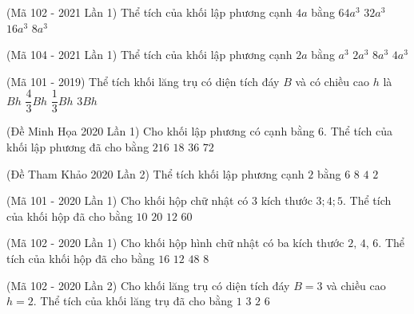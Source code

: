 \begin{ex}%
	(Mã 102 - 2021 Lần 1) Thể tích của khối lập phương cạnh $4a$ bằng
	\choice
	{$64a^3$}
	{$32a^3$}
	{$16a^3$}
	{$8a^3$}
\end{ex}
\begin{ex}%
	(Mã 104 - 2021 Lần 1) Thể tích của khối lập phương cạnh $2a$ bằng
	\choice
	{$a^3$}
	{$2a^3$}
	{$8a^3$}
	{$4a^3$}
\end{ex}
\begin{ex}%
	(Mã 101 - 2019) Thể tích khối lăng trụ có diện tích đáy $B$ và có chiều cao $h$ là
	\choice
	{$Bh$}
	{$\dfrac{4}{3}Bh$}
	{$\dfrac{1}{3}Bh$}
	{$3Bh$}
\end{ex}
\begin{ex}%
	(Đề Minh Họa 2020 Lần 1) Cho khối lập phương có cạnh bằng $6$. Thể tích của khối lập phương đã cho bằng
	\choice
	{\True $216$}
	{$18$}
	{$36$}
	{$72$}
\end{ex}
\begin{ex}%
	(Đề Tham Khảo 2020 Lần 2) Thể tích khối lập phương cạnh $2$ bằng
	\choice
	{$6$}
	{\True $8$}
	{$4$}
	{$2$}
\end{ex}
\begin{ex}%
	(Mã 101 - 2020 Lần 1) Cho khối hộp chữ nhật có 3 kích thước $3;4;5$. Thể tích của khối hộp đã cho bằng
	\choice
	{$10$}
	{$20$}
	{$12$}
	{\True $60$}
\end{ex}
\begin{ex}%
	(Mã 102 - 2020 Lần 1) Cho khối hộp hình chữ nhật có ba kích thước $2,\,4,\,6$. Thể tích của khối hộp đã cho bằng
	\choice
	{$16$}
	{$12$}
	{\True $48$}
	{$8$}
\end{ex}
\begin{ex}%
	(Mã 102 - 2020 Lần 2) Cho khối lăng trụ có diện tích đáy $B=3$ và chiều cao $h=2$. Thể tích của khối lăng trụ đã cho bằng
	\choice
	{$1$}
	{$3$}
	{$2$}
	{\True $6$}
\end{ex}

